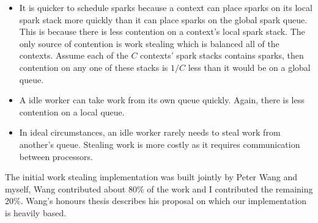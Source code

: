 \begin{itemize}

    \item
    It is quicker to schedule sparks because
    a context can place sparks on its local spark stack more quickly
    than it can place sparks on the global spark queue.
    This is because there is less contention on a context's
    local spark stack.
    The only source of contention is work stealing which is balanced all of
    the contexts.
    Assume each of the $C$ contexts' spark stacks contains sparks, then
    contention on any one of these stacks is $1/C$ less than it would be on
    a global queue.

    \item
    A idle worker can take work from its own queue quickly.
    Again, there is less contention on a local queue.

    \item
    In ideal circumstances,
    an idle worker rarely needs to steal work from another's queue.
    Stealing work is more costly as it requires communication between
    processors.

\end{itemize}

The initial work stealing implementation was built jointly by
Peter Wang and myself,
Wang contributed about 80\% of the work
and I contributed the remaining 20\%.
Wang's honours thesis \citep{wang:2006:hons} describes his proposal on which
our implementation is heavily based.

